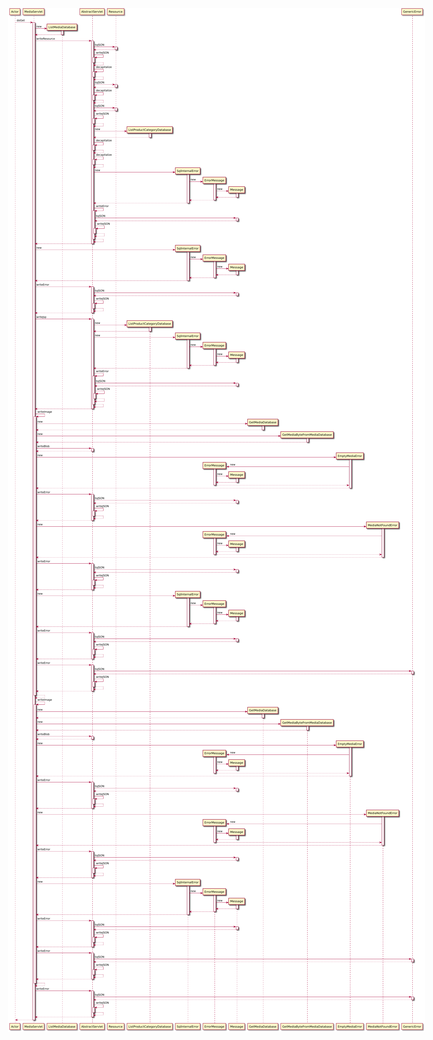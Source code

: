 \includegraphics[width=\textwidth,height=\textheight,keepaspectratio]{Schemas/MediaServlet_doGet.svg.pdf}

